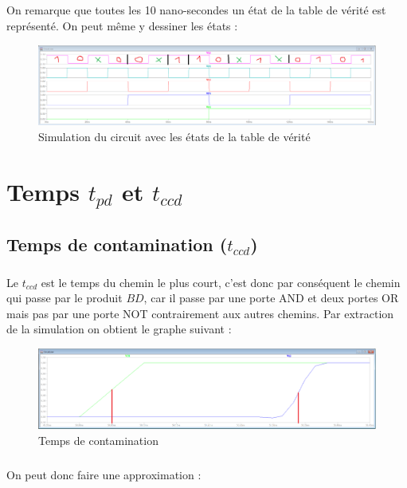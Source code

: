     \subparagraph{}On remarque que toutes les 10 nano-secondes un état de la table de vérité est représenté. 
    On peut même y dessiner les états :
    
        \begin{figure}[H]
            \centering
            \includegraphics[width=\textwidth]{../pictures/simufun.PNG}
            \caption{Simulation du circuit avec les états de la table de vérité}
            \label{fig:simuT}
        \end{figure}



\section{Temps $t_{pd}$ et $t_{ccd}$}

    \subsection{Temps de contamination ($t_{ccd}$)}
    
        \subparagraph{}Le $t_{ccd}$ est le temps du chemin le plus court, c'est donc par conséquent le chemin qui passe
         par le produit $BD$, car il passe par une porte AND et deux portes OR mais pas par une porte NOT contrairement
          aux autres chemins. Par extraction de la simulation on obtient le graphe suivant : 
        
            \begin{figure}[H]
                \centering
                \includegraphics[width=\textwidth]{../pictures/contaminationT.png}
                \caption{Temps de contamination}
            \end{figure}
            
        \subparagraph{}On peut donc faire une approximation :
            
